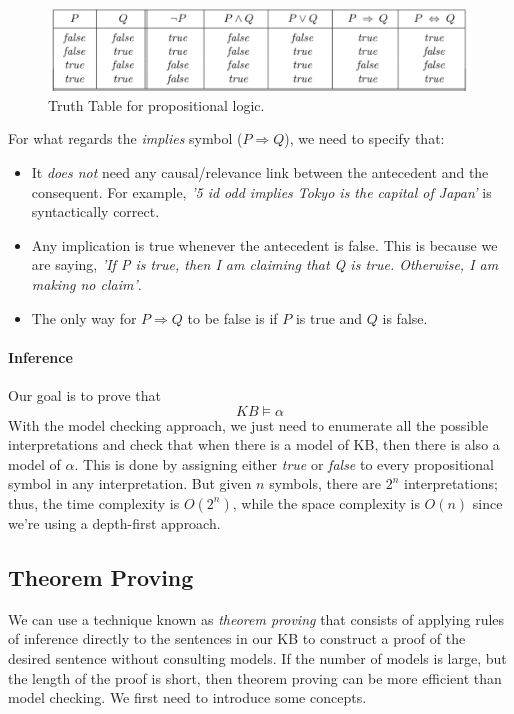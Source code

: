 \documentclass[10pt,a4paper]{article}
\begin{document}
\begin{figure}[H]
\includegraphics[scale=0.7]{images/truth_table.png}
\caption{Truth Table for propositional logic.}
\label{fig:truth_table}
\end{figure}

For  what regards the \textit{implies} symbol ($P \Rightarrow Q$), we need to specify that:
\begin{itemize}
\item It \textit{does not} need any causal/relevance link between the antecedent and the consequent. For example, \textit{'5 id odd implies Tokyo is the capital of Japan'} is syntactically correct.
\item Any implication is true whenever the antecedent is false. This is because we are saying, \textit{'If P is true, then I am claiming that Q is true. Otherwise, I am making no claim'}.
\item The only way for $P \Rightarrow Q$ to be false is if $P$ is true and $Q$ is false.
\end{itemize}


\paragraph{Inference}
Our goal is to prove that
\[KB \models \alpha\]
With the model checking approach, we just need to enumerate all the possible interpretations and check that when there is a model of KB, then there is also a model of $\alpha$. This is done by assigning either \textit{true} or \textit{false} to every propositional symbol in any interpretation. But given $n$ symbols, there are $2^n$ interpretations; thus, the time complexity is $O(2^n)$, while the space complexity is $O(n)$ since we're using a depth-first approach. 

\subsection{Theorem Proving}
We can use a technique known as \textit{theorem proving} that consists of applying rules of inference directly to the sentences in our KB to construct a proof of the desired sentence without consulting models. If the number of models is large, but the length of the proof is short, then theorem proving can be more efficient than model checking. We first need to introduce some concepts.
\end{document}
